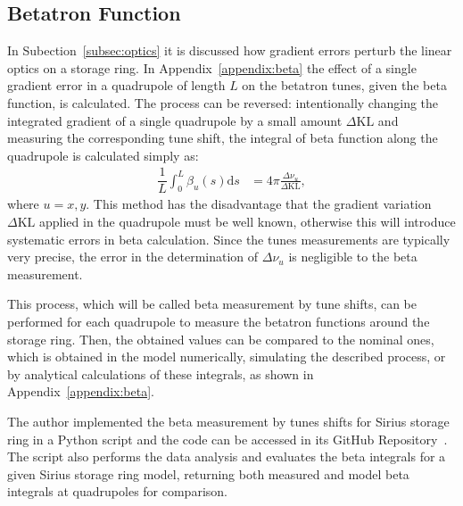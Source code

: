 \subsection{Betatron Function}
In Subection~\ref{subsec:optics} it is discussed how gradient errors perturb the linear optics on a storage ring. In Appendix~\ref{appendix:beta} the effect of a single gradient error in a quadrupole of length $L$ on the betatron tunes, given the beta function, is calculated. The process can be reversed: intentionally changing the integrated gradient of a single quadrupole by a small amount $\Delta \mathrm{KL}$ and measuring the corresponding tune shift, the integral of beta function along the quadrupole is calculated simply as:
\begin{align}
\dfrac{1}{L}\int_{0}^{L} \beta_u(s) \mathrm{d}s &= 4\pi\frac{\Delta \nu_u}{\Delta \mathrm{KL}},
\end{align}
where $u=x, y$. This method has the disadvantage that the gradient variation $\Delta \mathrm{KL}$ applied in the quadrupole must be well known, otherwise this will introduce systematic errors in beta calculation. Since the tunes measurements are typically very precise, the error in the determination of $\Delta \nu_u$ is negligible to the beta measurement.

This process, which will be called beta measurement by tune shifts, can be performed for each quadrupole to measure the betatron functions around the storage ring. Then, the obtained values can be compared to the nominal ones, which is obtained in the model numerically, simulating the described process, or by analytical calculations of these integrals, as shown in Appendix~\ref{appendix:beta}.

The author implemented the beta measurement by tunes shifts for Sirius storage ring in a Python script and the code can be accessed in its GitHub Repository~\cite{betasirius}. The script also performs the data analysis and evaluates the beta integrals for a given Sirius storage ring model, returning both measured and model beta integrals at quadrupoles for comparison.

